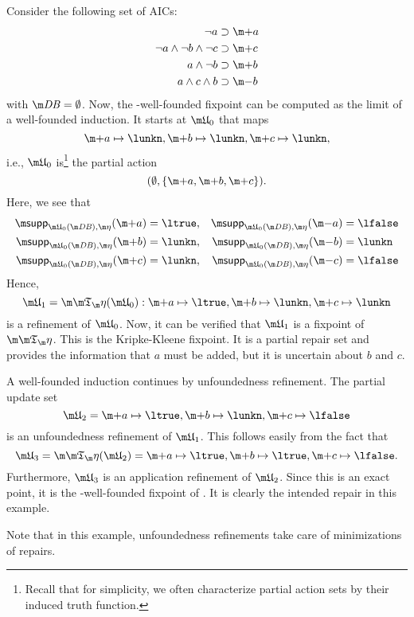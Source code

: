 \begin{example}
 Consider the following set \aics of AICs:
\begin{align*}
 \lnot a &\aicrule \add a \\ 
 \lnot a \land \lnot b \land \lnot c &\aicrule \add c\\
 a \land \lnot b &\aicrule \add b \\
 a \land c \land b &\aicrule \remove b
\end{align*} with $\db = \emptyset$.
Now, the \Ap-well-founded fixpoint can be computed as the limit of a well-founded induction. It starts at $\UUU_0$ that maps
\[\add a\mapsto \lunkn, \add b\mapsto \lunkn,\add c\mapsto\lunkn,\]
i.e., $\UUU_0$ is\footnote{Recall that for simplicity, we often characterize partial action sets by their induced truth function.} the partial action 
\[(\emptyset,\{\add a, \add b, \add c\}).\]
Here, we see that 
\begin{align*}
 \supp_{\UUU_0(\db),\aics}(\add a) &= \ltrue, & \supp_{\UUU_0(\db),\aics}(\remove a) &=\lfalse \\
 \supp_{\UUU_0(\db),\aics}(\add b) &= \lunkn, & \supp_{\UUU_0(\db),\aics}(\remove b) &=\lunkn \\
 \supp_{\UUU_0(\db),\aics}(\add c) &= \lunkn, & \supp_{\UUU_0(\db),\aics}(\remove c) &=\lfalse 
\end{align*}
Hence, 
\[\UUU_1 = \Ap(\UUU_0): \add a\mapsto \ltrue,\add  b\mapsto \lunkn,\add  c\mapsto\lunkn\]
is a refinement of $\UUU_0$. 
Now, it can be verified that $\UUU_1$ is a fixpoint of $\Ap$. This is the Kripke-Kleene fixpoint. It is a partial repair set and provides the information that $a$ must be added, but it is uncertain about $b$ and $c$. 

A well-founded induction continues by unfoundedness refinement. 
The partial update set
\[\UUU_2 = \add a\mapsto \ltrue, \add b\mapsto \lunkn,  \add c\mapsto\lfalse\]
is an unfoundedness refinement of $\UUU_1$.
This follows easily from the fact that 
\[\UUU_3 = \Ap(\UUU_2)= \add a\mapsto \ltrue, \add b\mapsto \ltrue, \add c\mapsto\lfalse.\]
Furthermore,
$\UUU_3$ is an application refinement of $\UUU_2$. Since this is an exact point, it is the \Ap-well-founded fixpoint of \Op. It is clearly the intended repair in this example.

Note that in this example, unfoundedness refinements take care of minimizations of repairs.  
\end{example}



